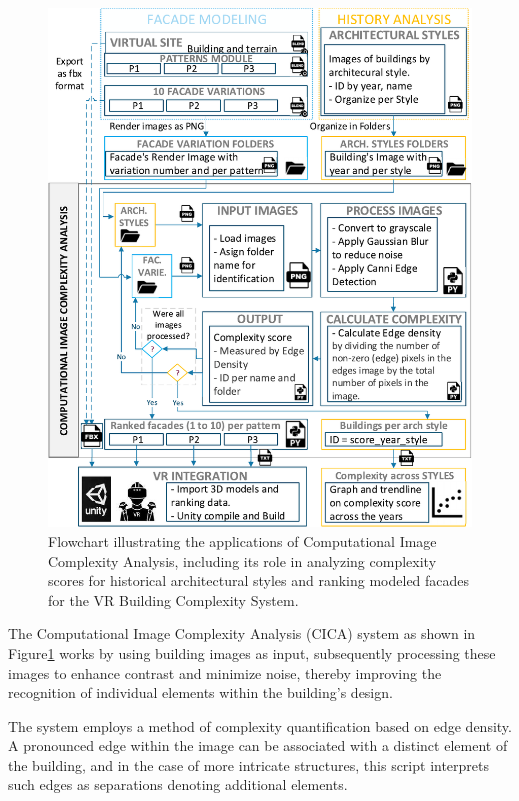     \begin{figure}[!htb]
      \centering
      \includegraphics[width= \linewidth, trim=0 0 0 0, clip]{Images/ImageComplexityAnalysisFlowchart}
      \caption{Flowchart illustrating the applications of Computational Image Complexity Analysis, including its role in analyzing complexity scores for historical architectural styles and ranking modeled facades for the VR Building Complexity System.}
      \label{fig:ImageComplexityAnalysisFlowchart}
    \end{figure}

The Computational Image Complexity Analysis (CICA) system as shown in Figure\ref{fig:ImageComplexityAnalysisFlowchart} works by using building images as input, subsequently processing these images to enhance contrast and minimize noise, thereby improving the recognition of individual elements within the building's design.

The system employs a method of complexity quantification based on edge density.
A pronounced edge within the image can be associated with a distinct element of the building, and in the case of more intricate structures, this script interprets such edges as separations denoting additional elements.

